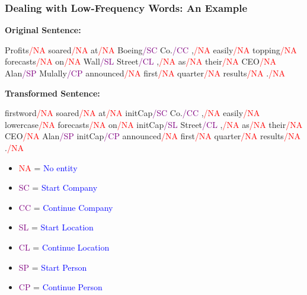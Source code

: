 \documentclass[handout]{beamer}
\begin{document}
\begin{frame}
  \frametitle{Dealing with Low-Frequency Words: An Example}
  \scriptsize
  
  
\textbf{Original Sentence:}

  Profits\textcolor{red}{/NA} soared\textcolor{red}{/NA} at\textcolor{red}{/NA} Boeing\textcolor{purple}{/SC} Co.\textcolor{purple}{/CC} ,\textcolor{red}{/NA} easily\textcolor{red}{/NA} topping\textcolor{red}{/NA} forecasts\textcolor{red}{/NA} on\textcolor{red}{/NA} Wall\textcolor{purple}{/SL} Street\textcolor{purple}{/CL} ,\textcolor{red}{/NA} as\textcolor{red}{/NA} their\textcolor{red}{/NA} CEO\textcolor{red}{/NA} Alan\textcolor{purple}{/SP} Mulally\textcolor{purple}{/CP} announced\textcolor{red}{/NA} first\textcolor{red}{/NA} quarter\textcolor{red}{/NA} results\textcolor{red}{/NA} .\textcolor{red}{/NA} \vspace{0.5cm}


\textbf{Transformed Sentence:}

firstword\textcolor{red}{/NA} soared\textcolor{red}{/NA} at\textcolor{red}{/NA} initCap\textcolor{purple}{/SC} Co.\textcolor{purple}{/CC} ,\textcolor{red}{/NA} easily\textcolor{red}{/NA} lowercase\textcolor{red}{/NA} forecasts\textcolor{red}{/NA} on\textcolor{red}{/NA} initCap\textcolor{purple}{/SL} Street\textcolor{purple}{/CL} ,\textcolor{red}{/NA} as\textcolor{red}{/NA} their\textcolor{red}{/NA} CEO\textcolor{red}{/NA} Alan\textcolor{purple}{/SP} initCap\textcolor{purple}{/CP} announced\textcolor{red}{/NA} first\textcolor{red}{/NA} quarter\textcolor{red}{/NA} results\textcolor{red}{/NA} .\textcolor{red}{/NA} \vspace{0.5cm}


  \begin{itemize}
    \item \textcolor{red}{NA} = \textcolor{blue}{No entity}
    \item \textcolor{purple}{SC} = \textcolor{blue}{Start Company}
    \item \textcolor{purple}{CC} = \textcolor{blue}{Continue Company}
    \item \textcolor{purple}{SL} = \textcolor{blue}{Start Location}
    \item \textcolor{purple}{CL} = \textcolor{blue}{Continue Location}
    \item \textcolor{purple}{SP} = \textcolor{blue}{Start Person}
    \item \textcolor{purple}{CP} = \textcolor{blue}{Continue Person}
  \end{itemize}
\end{frame}
\end{document}
